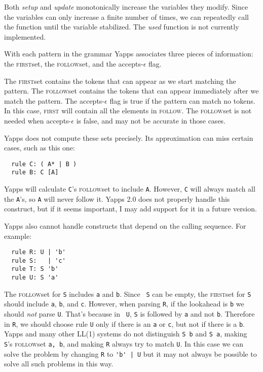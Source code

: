 \documentclass[10pt]{article}
\newcommand{\first}{\textsc{first}}
\newcommand{\follow}{\textsc{follow}}
\begin{document}
Both \emph{setup} and \emph{update} monotonically increase the
variables they modify.  Since the variables can only increase a finite
number of times, we can repeatedly call the function until the
variable stabilized.  The \emph{used} function is not currently
implemented.

With each pattern in the grammar Yapps associates three pieces of
information: the \first set, the \follow set, and the
accepts-$\epsilon$ flag.

The \first set contains the tokens that can appear as we start
matching the pattern.  The \follow set contains the tokens that can
appear immediately after we match the pattern.  The accepts-$\epsilon$ 
flag is true if the pattern can match no tokens.  In this case, \first 
will contain all the elements in \follow.  The \follow set is not
needed when accepts-$\epsilon$ is false, and may not be accurate in
those cases.

Yapps does not compute these sets precisely.  Its approximation can
miss certain cases, such as this one:

\begin{verbatim}
  rule C: ( A* | B )
  rule B: C [A]
\end{verbatim}

Yapps will calculate {\tt C}'s \follow set to include {\tt A}.
However, {\tt C} will always match all the {\tt A}'s, so {\tt A} will
never follow it.  Yapps 2.0 does not properly handle this construct,
but if it seems important, I may add support for it in a future
version.

Yapps also cannot handle constructs that depend on the calling
sequence.  For example:

\begin{verbatim}
  rule R: U | 'b'
  rule S:   | 'c'
  rule T: S 'b'
  rule U: S 'a'
\end{verbatim}

The \follow set for {\tt S} includes {\tt a} and {\tt b}.  Since {\tt
  S} can be empty, the \first set for {\tt S} should include {\tt a},
{\tt b}, and {\tt c}.  However, when parsing {\tt R}, if the lookahead
is {\tt b} we should \emph{not} parse {\tt U}.  That's because in {\tt
  U}, {\tt S} is followed by {\tt a} and not {\tt b}.  Therefore in
{\tt R}, we should choose rule {\tt U} only if there is an {\tt a} or
{\tt c}, but not if there is a {\tt b}.  Yapps and many other LL(1)
systems do not distinguish {\tt S b} and {\tt S a}, making {\tt
  S}'s \follow set {\tt a, b}, and making {\tt R} always try to match
{\tt U}.  In this case we can solve the problem by changing {\tt R} to 
\verb:'b' | U: but it may not always be possible to solve all such
problems in this way.
\end{document}
